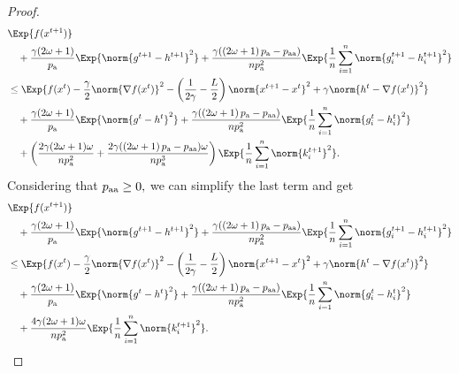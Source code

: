 \documentclass{article}
\newcommand*{\probavailable}{\ensuremath{p_{\textnormal{a}}}}
\newcommand*{\probpairaa}{\ensuremath{p_{\textnormal{aa}}}}
\begin{document}
\begin{proof}
  \begin{align*}
    &\Exp{f(x^{t + 1})} \\
    &\quad  + \frac{\gamma (2 \omega + 1)}{\probavailable} \Exp{\norm{g^{t+1} - h^{t+1}}^2} + \frac{\gamma (\left(2 \omega + 1\right)\probavailable - \probpairaa)}{n \probavailable^2} \Exp{\frac{1}{n}\sum_{i=1}^n\norm{g^{t+1}_i - h^{t+1}_i}^2}\\
    &\leq \Exp{f(x^t) - \frac{\gamma}{2}\norm{\nabla f(x^t)}^2 - \left(\frac{1}{2\gamma} - \frac{L}{2}\right)
    \norm{x^{t+1} - x^t}^2 + \gamma \norm{h^{t} - \nabla f(x^t)}^2}\nonumber\\
    &\quad + \frac{\gamma (2 \omega + 1)}{\probavailable}\Exp{\norm{g^{t} - h^t}^2}+ \frac{\gamma (\left(2 \omega + 1\right)\probavailable - \probpairaa)}{n \probavailable^2}\Exp{\frac{1}{n} \sum_{i=1}^n\norm{g^t_i - h^{t}_i}^2}\nonumber\\
    &\quad + \left(\frac{2 \gamma (2 \omega + 1)\omega}{n \probavailable^2} + \frac{2 \gamma (\left(2 \omega + 1\right)\probavailable - \probpairaa) \omega}{n \probavailable^3}\right)\Exp{\frac{1}{n} \sum_{i=1}^n\norm{k^{t+1}_i}^2}.
  \end{align*}
  Considering that $\probpairaa \geq 0,$ we can simplify the last term and get
  \begin{align*}
    &\Exp{f(x^{t + 1})} \\
    &\quad  + \frac{\gamma (2 \omega + 1)}{\probavailable} \Exp{\norm{g^{t+1} - h^{t+1}}^2} + \frac{\gamma (\left(2 \omega + 1\right)\probavailable - \probpairaa)}{n \probavailable^2} \Exp{\frac{1}{n}\sum_{i=1}^n\norm{g^{t+1}_i - h^{t+1}_i}^2}\\
    &\leq \Exp{f(x^t) - \frac{\gamma}{2}\norm{\nabla f(x^t)}^2 - \left(\frac{1}{2\gamma} - \frac{L}{2}\right)
    \norm{x^{t+1} - x^t}^2 + \gamma \norm{h^{t} - \nabla f(x^t)}^2}\nonumber\\
    &\quad + \frac{\gamma (2 \omega + 1)}{\probavailable}\Exp{\norm{g^{t} - h^t}^2}+ \frac{\gamma (\left(2 \omega + 1\right)\probavailable - \probpairaa)}{n \probavailable^2}\Exp{\frac{1}{n} \sum_{i=1}^n\norm{g^t_i - h^{t}_i}^2}\nonumber\\
    &\quad + \frac{4 \gamma (2 \omega + 1)\omega}{n \probavailable^2} \Exp{\frac{1}{n} \sum_{i=1}^n\norm{k^{t+1}_i}^2}.
  \end{align*}
\end{proof}


\end{document}
